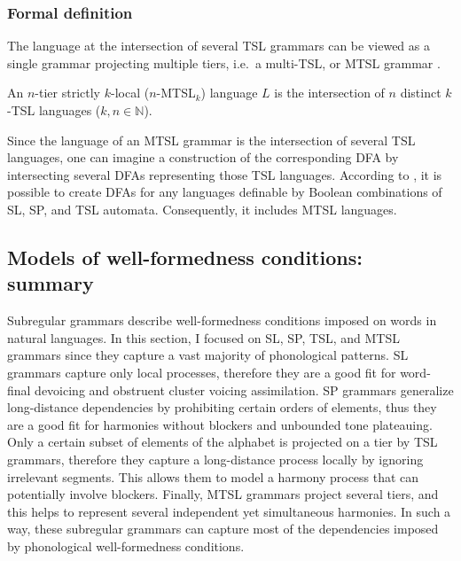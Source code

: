 \subsubsection{Formal definition}

The language at the intersection of several TSL grammars can be viewed as a single grammar projecting multiple tiers, i.e.\ a multi-TSL, or MTSL grammar \citep{DeSantoGraf19FG}.

\begin{definition}
An $n$-tier strictly $k$-local ($n$-MTSL$_k$) language $L$ is the intersection of $n$ distinct $k$-TSL languages ($k,n \in \mathbb{N}$).
\end{definition}

Since the language of an MTSL grammar is the intersection of several TSL languages, one can imagine a construction of the corresponding DFA by intersecting several DFAs representing those TSL languages.
According to \cite{LambertRogers2020}, it is possible to create DFAs for any languages definable by Boolean combinations of SL, SP, and TSL automata.
Consequently, it includes MTSL languages.










\subsection{Models of well-formedness conditions: summary}

Subregular grammars describe well-formedness conditions imposed on words in natural languages.
In this section, I focused on SL, SP, TSL, and MTSL grammars since they capture a vast majority of phonological patterns.
SL grammars capture only local processes, therefore they are a good fit for word-final devoicing and obstruent cluster voicing assimilation.
SP grammars generalize long-distance dependencies by prohibiting certain orders of elements, thus they are a good fit for harmonies without blockers and unbounded tone plateauing.
Only a certain subset of elements of the alphabet is projected on a tier by TSL grammars, therefore they capture a long-distance process locally by ignoring irrelevant segments.
This allows them to model a harmony process that can potentially involve blockers.
Finally, MTSL grammars project several tiers, and this helps to represent several independent yet simultaneous harmonies. 
In such a way, these subregular grammars can capture most of the dependencies imposed by phonological well-formedness conditions.


